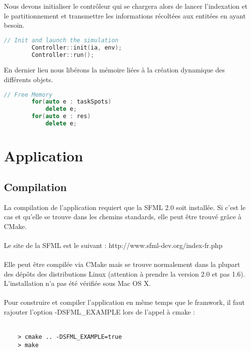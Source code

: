 Nous devons initialiser le contrôleur qui se chargera alors de lancer l'indexation et le partitionnement et transmettre les informations récoltées aux entitées en ayant besoin.

\begin{lstlisting}[label=nvi_code,caption=Initialisation et lancement du contrôleur,language=C++]         
        // Init and launch the simulation
        Controller::init(ia, env);
        Controller::run();
\end{lstlisting}

En dernier lieu nous libérons la mémoire liées à la création dynamique des différents objets.

\begin{lstlisting}[label=nvi_code,caption=Libération des resources,language=C++]        
        // Free Memory
        for(auto e : taskSpots)
            delete e;
        for(auto e : res)
            delete e;
\end{lstlisting}

\section{Application}
\subsection{Compilation}
La compilation de l'application requiert que la SFML 2.0 soit installée. Si c'est le cas et qu'elle se trouve dans les chemins standards, elle peut être trouvé grâce à CMake.\\\\

Le site de la SFML est le suivant : http://www.sfml-dev.org/index-fr.php \\\\

Elle peut être compilée via CMake mais se trouve normalement dans la plupart des dépôts des distributions Linux (attention à prendre la version 2.0 et pas 1.6). L'installation n'a pas été vérifiée sous Mac OS X.\\\\

Pour construire et compiler l'application en même temps que le framwork, il faut rajouter l'option -DSFML\_EXAMPLE lors de l'appel à cmake :\\\\

\begin{verbatim}
    > cmake .. -DSFML_EXAMPLE=true
    > make
\end{verbatim}

